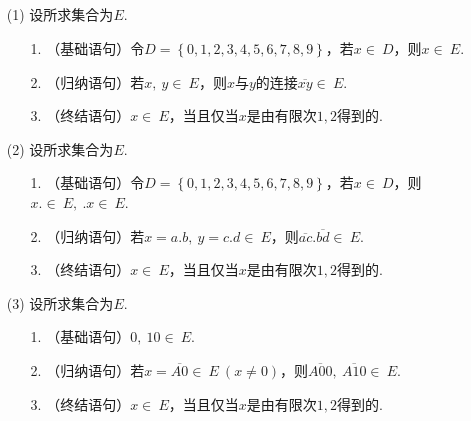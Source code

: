 \documentclass[UTF8]{ctexart}
\begin{document}
\subsection{}   %
\begin{enumerate}
    \item [(1)]设所求集合为$E$.
    \begin{enumerate}
        \item [1.]（基础语句）令$D=\left\{0,1,2,3,4,5,6,7,8,9\right\}$，若$x\in\ D$，则$x\in\ E$.
        \item [2.]（归纳语句）若$x,\ y\in\ E$，则$x$与$y$的连接$\overline{xy}\in\ E$.
        \item [3.]（终结语句）$x\in \ E$，当且仅当$x$是由有限次$1,2$得到的.
    \end{enumerate}

    \item [(2)]设所求集合为$E$.
    \begin{enumerate}
        \item [1.]（基础语句）令$D=\left\{0,1,2,3,4,5,6,7,8,9\right\}$，若$x\in\ D$，则$x.\in\ E,\ .x\in\ E$.
        \item [2.]（归纳语句）若$x=a.b,\ y=c.d\in\ E$，则$\overline{ac} . \overline{bd}\in\ E$.
        \item [3.]（终结语句）$x\in \ E$，当且仅当$x$是由有限次$1,2$得到的.
    \end{enumerate}

    \item [(3)]设所求集合为$E$.
    \begin{enumerate}
        \item [1.]（基础语句）$0,\ 10\in\ E$.
        \item [2.]（归纳语句）若$x=\overline{A0}\in\ E\ (x\neq 0)$，则$\overline{A00},\ \overline{A10}\in \ E$.
        \item [3.]（终结语句）$x\in \ E$，当且仅当$x$是由有限次$1,2$得到的.
    \end{enumerate}
\end{enumerate}
\end{document}
